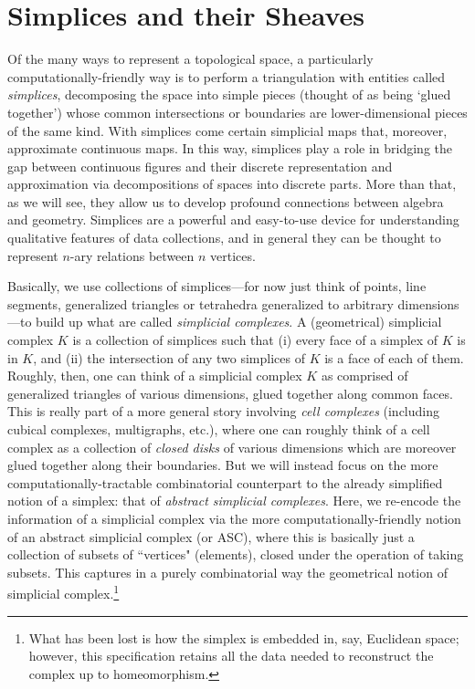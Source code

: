\documentclass[11pt]{book}
\theoremstyle{definition}
\theoremstyle{definition}
\theoremstyle{definition}
\theoremstyle{theorem}
\theoremstyle{definition}
\begin{document}
\section{Simplices and their Sheaves}
Of the many ways to represent a topological space, a particularly computationally-friendly way is to perform a triangulation with entities called \textit{simplices}, decomposing the space into simple pieces (thought of as being `glued together') whose common intersections or boundaries are lower-dimensional pieces of the same kind. With simplices come certain simplicial maps that, moreover, approximate continuous maps. In this way, simplices play a role in bridging the gap between continuous figures and their discrete representation and approximation via decompositions of spaces into discrete parts. More than that, as we will see, they allow us to develop profound connections between algebra and geometry. Simplices are a powerful and easy-to-use device for understanding qualitative features of data collections, and in general they can be thought to represent $n$-ary relations between $n$ vertices. \par 
	Basically, we use collections of simplices---for now just think of points, line segments, generalized triangles or tetrahedra generalized to arbitrary dimensions---to build up what are called \textit{simplicial complexes}. A (geometrical) simplicial complex $K$ is a collection of simplices such that (i) every face of a simplex of $K$ is in $K$, and (ii) the intersection of any two simplices of $K$ is a face of each of them. Roughly, then, one can think of a simplicial complex $K$ as comprised of generalized triangles of various dimensions, glued together along common faces. This is really part of a more general story involving \textit{cell complexes} (including cubical complexes, multigraphs, etc.), where one can roughly think of a cell complex as a collection of \textit{closed disks} of various dimensions which are moreover glued together along their boundaries. But we will instead focus on the more computationally-tractable combinatorial counterpart to the already simplified notion of a simplex: that of \textit{abstract simplicial complexes}. Here, we re-encode the information of a simplicial complex via the more computationally-friendly notion of an abstract simplicial complex (or ASC), where this is basically just a collection of subsets of ``vertices" (elements), closed under the operation of taking subsets. This captures in a purely combinatorial way the geometrical notion of simplicial complex.\footnote{What has been lost is how the simplex is embedded in, say, Euclidean space; however, this specification retains all the data needed to reconstruct the complex up to homeomorphism.}   
\end{document}

